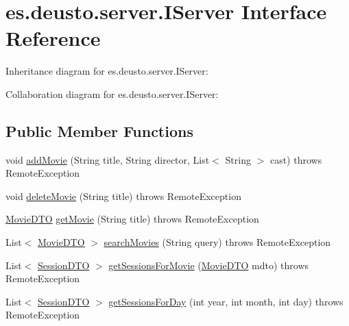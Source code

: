 \hypertarget{interfacees_1_1deusto_1_1server_1_1_i_server}{}\section{es.\+deusto.\+server.\+I\+Server Interface Reference}
\label{interfacees_1_1deusto_1_1server_1_1_i_server}


Inheritance diagram for es.\+deusto.\+server.\+I\+Server\+:


Collaboration diagram for es.\+deusto.\+server.\+I\+Server\+:
\subsection*{Public Member Functions}
\begin{DoxyCompactItemize}
\item 
void \mbox{\hyperlink{interfacees_1_1deusto_1_1server_1_1_i_server_a393d8689e14b3534dfa425e4c900532e}{add\+Movie}} (String title, String director, List$<$ String $>$ cast)  throws Remote\+Exception
\item 
void \mbox{\hyperlink{interfacees_1_1deusto_1_1server_1_1_i_server_a0b3243dc04d49f7659fefec4e4fb43b7}{delete\+Movie}} (String title)  throws Remote\+Exception
\item 
\mbox{\hyperlink{classes_1_1deusto_1_1server_1_1data_1_1_movie_d_t_o}{Movie\+D\+TO}} \mbox{\hyperlink{interfacees_1_1deusto_1_1server_1_1_i_server_a2b7883e416d98a7c92de13cbed7af450}{get\+Movie}} (String title)  throws Remote\+Exception
\item 
List$<$ \mbox{\hyperlink{classes_1_1deusto_1_1server_1_1data_1_1_movie_d_t_o}{Movie\+D\+TO}} $>$ \mbox{\hyperlink{interfacees_1_1deusto_1_1server_1_1_i_server_a50b7dacdeb04d5f1ee3f3b59989ed117}{search\+Movies}} (String query)  throws Remote\+Exception
\item 
List$<$ \mbox{\hyperlink{classes_1_1deusto_1_1server_1_1data_1_1_session_d_t_o}{Session\+D\+TO}} $>$ \mbox{\hyperlink{interfacees_1_1deusto_1_1server_1_1_i_server_a33dc65de2a567be10bf2477ee28765f8}{get\+Sessions\+For\+Movie}} (\mbox{\hyperlink{classes_1_1deusto_1_1server_1_1data_1_1_movie_d_t_o}{Movie\+D\+TO}} mdto)  throws Remote\+Exception
\item 
List$<$ \mbox{\hyperlink{classes_1_1deusto_1_1server_1_1data_1_1_session_d_t_o}{Session\+D\+TO}} $>$ \mbox{\hyperlink{interfacees_1_1deusto_1_1server_1_1_i_server_aac50d6a77e30df4d4c15fcaf4ba979f5}{get\+Sessions\+For\+Day}} (int year, int month, int day)  throws Remote\+Exception

\end{DoxyCompactItemize}
